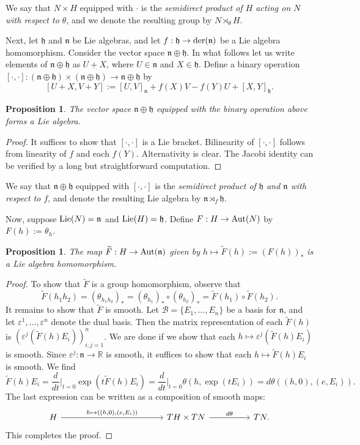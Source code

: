 \documentclass{amsart}
\newcommand{\R}{\mathbb R}
\newcommand{\lie}{\text{\normalfont Lie}}
\newcommand{\der}{\text{\normalfont der}}
\newcommand{\aut}{\text{\normalfont Aut}}
\newcommand{\n}{\mathfrak n}
\newcommand{\h}{\mathfrak h}
\theoremstyle{plain}
\newtheorem{proposition}[theorem]{Proposition}
\theoremstyle{definition}
\theoremstyle{remark}
\begin{document}
	We say that $N \times H$ equipped with $\cdot$ is the \emph{semidirect product of $H$ acting on $N$ with respect to $\theta$}, and we denote the resulting group by $N \rtimes_\theta H$.
	
	
	Next, let $\h$ and $\n$ be Lie algebras, and let $f:\h \rightarrow \der(\n)$ be a Lie algebra homomorphism. Consider the vector space $\n \oplus \h$. In what follows let us write elements of $\n \oplus \h$ as $U+X$, where $U \in \n$ and $X \in \h$. Define a binary operation $[\cdot, \cdot]: (\n \oplus \h) \times (\n \oplus \h) \rightarrow \n \oplus \h$ by 
	$$[U+X,V+Y] := [U,V]_\n + f(X)V - f(Y)U + [X,Y]_\h.$$
	\begin{proposition}
		The vector space $\n \oplus \h$ equipped with the binary operation above forms a Lie algebra.
	\end{proposition}
	\begin{proof}
		It suffices to show that $[\cdot,\cdot]$ is a Lie bracket. Bilinearity of $[\cdot,\cdot]$ follows from linearity of $f$ and each $f(Y)$. Alternativity is clear. The Jacobi identity can be verified by a long but straightforward computation.
	\end{proof}
	We say that $\n \oplus \h$ equipped with $[\cdot,\cdot]$ is the \emph{semidirect product of $\h$ and $\n$ with respect to $f$}, and denote the resulting Lie algebra by $\n \rtimes_f \h$.

	Now, suppose $\lie(N)  = \n$ and $\lie(H) = \h$. Define $F:H \rightarrow \aut(N)$ by $F(h) := \theta_h$. 
	\begin{proposition}
		The map $\widetilde F:H \rightarrow \aut(\n)$ given by $h \mapsto \widetilde F(h) := (F(h))_{*}$ is a Lie algebra homomorphism.
	\end{proposition}
	\begin{proof}
		To show that $\widetilde F$ is a group homomorphism, observe that 
		$$\widetilde F(h_1 h_2) = (\theta_{h_1h_2})_* = (\theta_{h_1})_* \circ (\theta_{h_2})_* = \widetilde F(h_1) \circ \widetilde F(h_2).$$
		It remains to show that $\widetilde F$ is smooth. Let $\mathcal B = \{E_1,\ldots,E_n\}$ be a basis for $\n$, and let $\varepsilon^1,\ldots,\varepsilon^n$ denote the dual basis. Then the matrix representation of each $\widetilde F(h)$ is  $(\varepsilon^j(\widetilde F(h) E_i))_{i,j=1}^n$. We are done if we show that each $h \mapsto \varepsilon^j(\widetilde F(h) E_i)$ is smooth. Since $\varepsilon^j:\n \rightarrow \R$ is smooth, it suffices to show that each $h \mapsto \widetilde F(h) E_i$ is smooth. We find 
		$$\widetilde F(h) E_i = \frac{d}{dt}\bigg|_{t=0} \exp(t \widetilde F(h)E_i)
		= \frac{d}{dt}\bigg|_{t=0} \theta(h, \exp(tE_i)) = d\theta((h,0), (e,E_i)).$$
		The last expression can be written as a composition of smooth maps:
		$$\begin{tikzcd}
			H \arrow{rrrrr}{h \mapsto ((h,0), (e,E_i))} &&&&& TH \times TN \arrow{rr}{d\theta} && TN.
		\end{tikzcd}$$
		This completes the proof.
	\end{proof}
\end{document}
